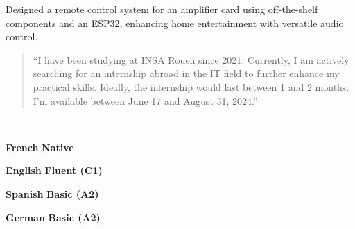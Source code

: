 \documentclass[10pt,a4paper,ragged2e,withhyper]{./AltaCV/altacv}
\begin{document}
\begin{paracol}{2}
  \divider

  {}
  {}
  {}
  Designed a remote control system for an amplifier card using off-the-shelf components and an ESP32, enhancing home entertainment with versatile audio control.
 
  \medskip

  \switchcolumn


  \begin{quote}
    ``I have been studying at INSA Rouen since 2021.
    Currently, I am actively searching for an internship abroad in the IT field to further enhance my practical skills.
    Ideally, the internship would last between 1 and 2 months.
    I'm available between June 17 and August 31, 2024.''
  \end{quote}



  \divider


  \divider



  \\

  \divider

  \cvtag{\LaTeX}


  \textcolor{emphasis}{\textbf{French}} \hfill \textbf{Native}\\

  \divider

  \textcolor{emphasis}{\textbf{English}} \hfill \textbf{Fluent (C1)}\\

  \divider

  \textcolor{emphasis}{\textbf{Spanish}} \hfill \textbf{Basic (A2)}\\

  \divider

  \textcolor{emphasis}{\textbf{German}} \hfill \textbf{Basic (A2)}\\

\end{paracol}
\end{document}
